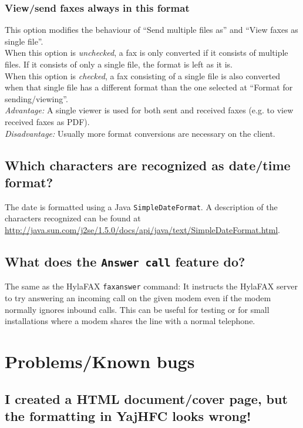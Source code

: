 \documentclass[a4paper,10pt]{scrartcl}
\begin{document}
\subsubsection{View/send faxes always in this format}
This option modifies the behaviour of ``Send multiple files as'' and ``View faxes as single file''.\\
When this option is \textit{unchecked}, a fax is only converted if it consists of multiple files. If it consists of only a single file, the format is left as it is.\\
When this option is \textit{checked}, a fax consisting of a single file is also converted when that single file has a different format than the one selected at ``Format for sending/viewing''.\\
\textit{Advantage:} A single viewer is used for both sent and received faxes (e.g. to view received faxes as PDF).\\
\textit{Disadvantage:} Usually more format conversions are necessary on the client.

\subsection{Which characters are recognized as date/time format?}

The date is formatted using a Java \texttt{SimpleDateFormat}. A description of the characters recognized can be found at \url{http://java.sun.com/j2se/1.5.0/docs/api/java/text/SimpleDateFormat.html}.

\subsection{What does the \texttt{Answer call} feature do?}

The same as the HylaFAX \verb#faxanswer# command: It instructs the HylaFAX server to try answering an incoming call on the given modem even if the modem normally ignores inbound calls. This can be useful for testing or for small installations where a modem shares the line with a normal telephone.

\section{Problems/Known bugs}

\subsection{I created a HTML document/cover page, but the formatting in YajHFC looks wrong!}
\end{document}
